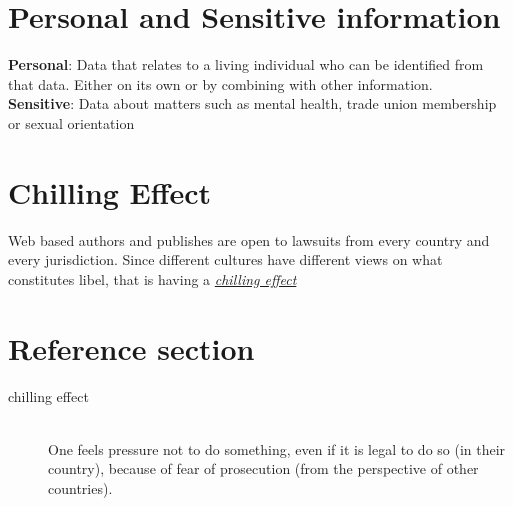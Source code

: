 \documentclass{article}
\newcommand{\worddef}[1]{\hyperref[sec:reference]{\textit{#1}}}
\begin{document}
\section{Personal and Sensitive information}
\begin{flushleft}
\textbf{Personal}: Data that relates to a living individual who can be identified from that data. Either on its own or by combining with other information.\\
\textbf{Sensitive}: Data about matters such as mental health, trade union membership or sexual orientation
\end{flushleft}

\section{Chilling Effect}
\begin{flushleft}
Web based authors and publishes are open to lawsuits from every country and every jurisdiction. Since different cultures have different views on what constitutes libel, that is having a \worddef{chilling effect}
\end{flushleft}

\pagebreak
\section*{Reference section} \label{sec:reference}
\begin{description}
	\item[chilling effect] \hfill \\ One feels pressure not to do something, even if it is legal to do so (in their country), because of fear of prosecution (from the perspective of other countries).
\end{description}
\end{document}
